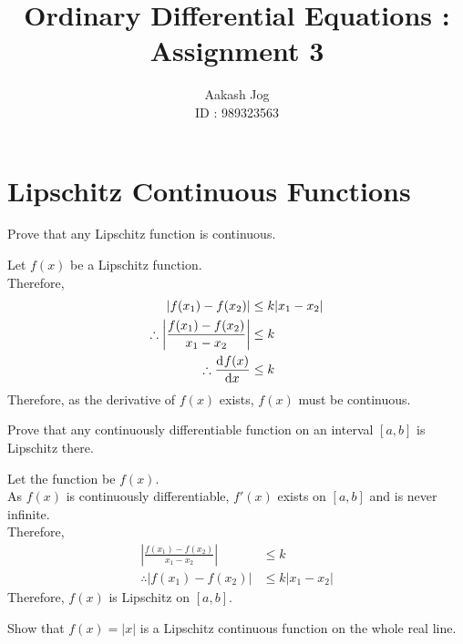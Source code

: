 \documentclass[fleqn, a4paper, 12pt, oneside]{amsart}
\title{Ordinary Differential Equations : Assignment 3}
\author
{
	Aakash Jog\\
	ID : 989323563
}
\date{\formatdate{4}{5}{2015}}
\theoremstyle{definition}
\theoremstyle{theorem}
\begin{document}
	
\maketitle

\part{Lipschitz Continuous Functions}

\begin{question}
	Prove that any Lipschitz function is continuous.
\end{question}

\begin{solution}
	Let $f(x)$ be a Lipschitz function.\\
	Therefore,
	\begin{align*}
		|f(x_1) - f(x_2)|                                           & \le k |x_1 - x_2| \\
		\therefore \left| \frac{f(x_1) - f(x_2)}{x_1 - x_2} \right| & \le k             \\
		\therefore \dod{f(x)}{x}                                    & \le k
	\end{align*}
	Therefore, as the derivative of $f(x)$ exists, $f(x)$ must be continuous.
\end{solution}

\begin{question}
	Prove that any continuously differentiable function on an interval $[a,b]$ is Lipschitz there.
\end{question}

\begin{solution}
	Let the function be $f(x)$.\\
	As $f(x)$ is continuously differentiable, $f'(x)$ exists on $[a,b]$ and is never infinite.\\
	Therefore,
	\begin{align*}
		\left| \frac{f(x_1) - f(x_2)}{x_1 - x_2} \right| & \le k \\
		\therefore | f(x_1) - f(x_2)|                    & \le k |x_1 - x_2|
	\end{align*}
	Therefore, $f(x)$ is Lipschitz on $[a,b]$.
\end{solution}

\begin{question}
	Show that $f(x) = |x|$ is a Lipschitz continuous function on the whole real line.
\end{question}
\end{document}
